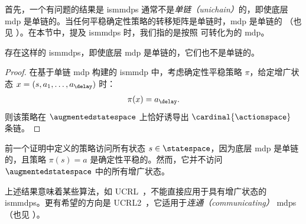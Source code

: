 首先，一个有问题的结果是 \glspl{ismmdp} 通常不是\emph{单链（unichain）}的，即使底层 \gls{mdp} 是单链的。当任何平稳确定性策略的转移矩阵是单链时，\gls{mdp} 是单链的 \cite[Section~8.3.1]{puterman1994markov}（也见 ）。在本节中，提及 \glspl{ismmdp} 时，我们指的是按照  可转化为的 \gls{mdp}。

\begin{prop}
\label{pp:unichain_ismmdp}
    存在这样的 \glspl{ismmdp}，即使底层 \gls{mdp} 是单链的，它们也不是单链的。
\end{prop}
\begin{proof}
    在基于单链 \gls{mdp} 构建的 \gls{ismmdp} 中，考虑确定性平稳策略 $\pi$，给定增广状态 $x=(s,a_1,\dots,a_\delay)$ 时：
    \begin{align*}
        \pi(x) = a_\delay.
    \end{align*}
    则该策略在 $\augmentedstatespace$ 上恰好诱导出 $\cardinal{\actionspace}$ 条链。
\end{proof}


\begin{remark}
    前一个证明中定义的策略访问所有状态 $s\in\statespace$，因为底层 \gls{mdp} 是单链的，且策略 $\pi(s) = a$ 是确定性平稳的。然而，它并不访问 $\augmentedstatespace$ 中的所有增广状态。
\end{remark}

上述结果意味着某些算法，如 UCRL~\cite{auer2006logarithmic}，不能直接应用于具有增广状态的 \glspl{ismmdp}。更有希望的方向是 UCRL2~\cite{auer2008near}，它适用于\emph{连通（communicating）} \glspl{mdp} \cite[Section~8.3.1]{puterman1994markov}（也见 ）。

